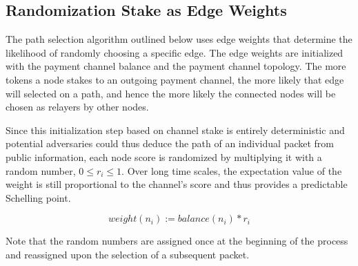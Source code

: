 \subsection{Randomization Stake as Edge Weights}
The path selection algorithm outlined below uses edge weights that determine the likelihood of randomly choosing a specific edge. The edge weights are initialized with the payment channel balance and the payment channel topology. The more tokens a node stakes to an outgoing payment channel, the more likely that edge will selected on a path, and hence the more likely the connected nodes will be chosen as relayers by other nodes.

Since this initialization step based on channel stake is entirely deterministic and potential adversaries could thus deduce the path of an individual packet from public information, each node score is randomized by multiplying it with a random number, $0 \le r_i \le 1$. Over long time scales, the expectation value of the weight is still proportional to the channel's score and thus provides a predictable Schelling point.

$$ weight(n_i) := balance(n_i) * r_i$$

Note that the random numbers are assigned once at the beginning of the process and reassigned upon the selection of a subsequent packet.